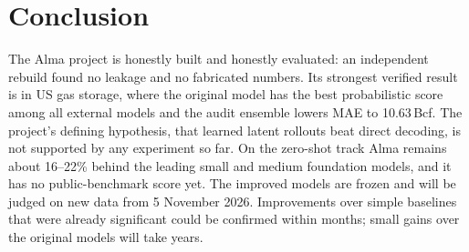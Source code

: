 \documentclass[10pt,a4paper]{article}
\begin{document}
\section{Conclusion}
The Alma project is honestly built and honestly evaluated: an independent rebuild found no leakage and no fabricated numbers. Its strongest verified result is in US gas storage, where the original model has the best probabilistic score among all external models and the audit ensemble lowers MAE to 10.63\,Bcf. The project's defining hypothesis, that learned latent rollouts beat direct decoding, is not supported by any experiment so far. On the zero-shot track Alma remains about 16--22\% behind the leading small and medium foundation models, and it has no public-benchmark score yet. The improved models are frozen and will be judged on new data from 5 November 2026. Improvements over simple baselines that were already significant could be confirmed within months; small gains over the original models will take years.

\appendix
\end{document}
